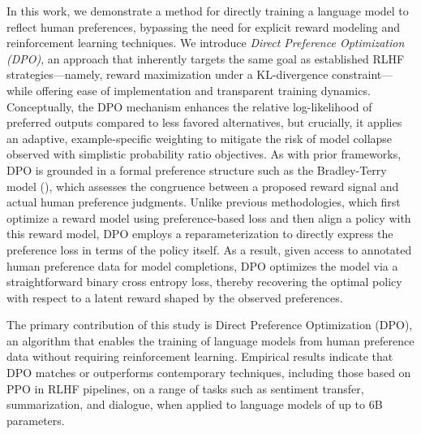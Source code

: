 In this work, we demonstrate a method for directly training a language model to reflect human preferences, bypassing the need for explicit reward modeling and reinforcement learning techniques. We introduce \textit{Direct Preference Optimization (DPO)}, an approach that inherently targets the same goal as established RLHF strategies—namely, reward maximization under a KL-divergence constraint—while offering ease of implementation and transparent training dynamics. Conceptually, the DPO mechanism enhances the relative log-likelihood of preferred outputs compared to less favored alternatives, but crucially, it applies an adaptive, example-specific weighting to mitigate the risk of model collapse observed with simplistic probability ratio objectives. As with prior frameworks, DPO is grounded in a formal preference structure such as the Bradley-Terry model (\cite{bradley1952rankanalysis}), which assesses the congruence between a proposed reward signal and actual human preference judgments. Unlike previous methodologies, which first optimize a reward model using preference-based loss and then align a policy with this reward model, DPO employs a reparameterization to directly express the preference loss in terms of the policy itself. As a result, given access to annotated human preference data for model completions, DPO optimizes the model via a straightforward binary cross entropy loss, thereby recovering the optimal policy with respect to a latent reward shaped by the observed preferences.

The primary contribution of this study is Direct Preference Optimization (DPO), an algorithm that enables the training of language models from human preference data without requiring reinforcement learning. Empirical results indicate that DPO matches or outperforms contemporary techniques, including those based on PPO in RLHF pipelines, on a range of tasks such as sentiment transfer, summarization, and dialogue, when applied to language models of up to 6B parameters.

